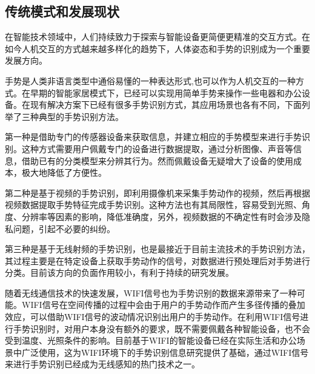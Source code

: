 \documentclass[a4paper]{article}
\begin{document}
\subsection{传统模式和发展现状}
  在智能技术领域中，人们持续致力于探索与智能设备更简便更精准的交互方式。在如今人机交互的方式越来越多样化的趋势下，人体姿态和手势的识别成为一个重要发展方向。\par
  手势是人类非语言类型中通俗易懂的一种表达形式,也可以作为人机交互的一种方式。在早期的智能家居模式下，已经可以实现用简单手势来操作一些电器和办公设备。在现有解决方案下已经有很多手势识别方式，其应用场景也各有不同，下面列举了三种典型的手势识别方法。 \par
  第一种是借助专门的传感器设备来获取信息，并建立相应的手势模型来进行手势识别。这种方式需要用户佩戴专门的设备进行数据提取，通过分析图像、声音等信息，借助已有的分类模型来分辨其行为。然而佩戴设备无疑增大了设备的使用成本，极大地降低了方便性。\par
  第二种是基于视频的手势识别，即利用摄像机来采集手势动作的视频，然后再根据视频数据提取手势特征完成手势识别。这种方法也有其局限性，容易受到光照、角度、分辨率等因素的影响，降低准确度，另外，视频数据的不确定性有时会涉及隐私问题，引起不必要的纠纷。\par
  第三种是基于无线射频的手势识别，也是最接近于目前主流技术的手势识别方法，其过程主要是在特定设备上获取手势动作的信号，对数据进行预处理后对手势进行分类。目前该方向的负面作用较小，有利于持续的研究发展。\par
  随着无线通信技术的快速发展，WIFI信号也为手势识别的数据来源带来了一种可能。WIFI信号在空间传播的过程中会由于用户的手势动作而产生多径传播的叠加效应，可以借助WIFI信号的波动情况识别出用户的手势动作。在利用WIFI信号进行手势识别时，对用户本身没有额外的要求，既不需要佩戴各种智能设备，也不会受到温度、光照条件的影响。目前基于WIFI的智能设备已经在实际生活和办公场景中广泛使用，这为WIFI环境下的手势识别信息研究提供了基础，通过WIFI信号来进行手势识别已经成为无线感知的热门技术之一。
\end{document}
